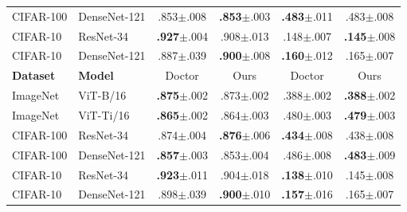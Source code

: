 \begin{table}[t]
{\begin{tabular}{@{}llcccc@{}}
CIFAR-100 & DenseNet-121 & .853{\scriptsize $\pm$.008} & \textbf{.853}{\scriptsize $\pm$.003} & \textbf{.483}{\scriptsize $\pm$.011} & .483{\scriptsize $\pm$.008} \\
CIFAR-10 & ResNet-34 & \textbf{.927}{\scriptsize $\pm$.004} & .908{\scriptsize $\pm$.013} & .148{\scriptsize $\pm$.007} & \textbf{.145}{\scriptsize $\pm$.008} \\
CIFAR-10 & DenseNet-121 & .887{\scriptsize $\pm$.039} & \textbf{.900}{\scriptsize $\pm$.008} & \textbf{.160}{\scriptsize $\pm$.012} & .165{\scriptsize $\pm$.007} \\
\midrule
\textbf{Dataset} & \textbf{Model} & Doctor & Ours & Doctor & Ours \\
\midrule
ImageNet & ViT-B/16 & \textbf{.875}{\scriptsize $\pm$.002} & .873{\scriptsize $\pm$.002} & .388{\scriptsize $\pm$.002} & \textbf{.388}{\scriptsize $\pm$.002} \\
ImageNet & ViT-Ti/16 & \textbf{.865}{\scriptsize $\pm$.002} & .864{\scriptsize $\pm$.003} & .480{\scriptsize $\pm$.003} & \textbf{.479}{\scriptsize $\pm$.003} \\
CIFAR-100 & ResNet-34 & .874{\scriptsize $\pm$.004} & \textbf{.876}{\scriptsize $\pm$.006} & \textbf{.434}{\scriptsize $\pm$.008} & .438{\scriptsize $\pm$.008} \\
CIFAR-100 & DenseNet-121 & \textbf{.857}{\scriptsize $\pm$.003} & .853{\scriptsize $\pm$.004} & .486{\scriptsize $\pm$.008} & \textbf{.483}{\scriptsize $\pm$.009} \\
CIFAR-10 & ResNet-34 & \textbf{.923}{\scriptsize $\pm$.011} & .904{\scriptsize $\pm$.018} & \textbf{.138}{\scriptsize $\pm$.010} & .145{\scriptsize $\pm$.008} \\
CIFAR-10 & DenseNet-121 & .898{\scriptsize $\pm$.039} & \textbf{.900}{\scriptsize $\pm$.010} & \textbf{.157}{\scriptsize $\pm$.016} & .165{\scriptsize $\pm$.007} \\
\bottomrule
\end{tabular}%
}
\end{table}